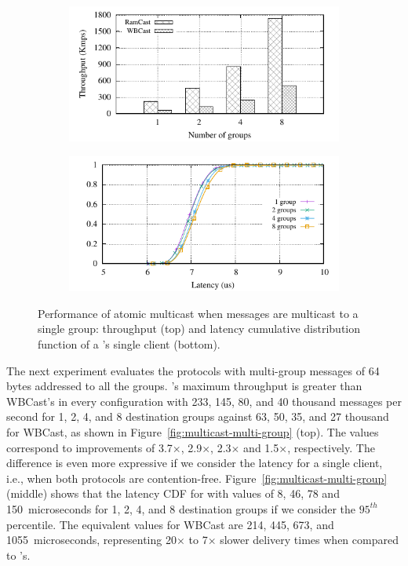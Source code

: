 \begin{figure}[htp!]
  \begin{subfigure}{\columnwidth}
    \advance\leftskip-0.25cm
    \includegraphics[width=1.01\columnwidth]{figures/benchmark/graphs/figure-genuine-compare-throughput}
  \end{subfigure}
  \begin{subfigure}{\columnwidth}
    \centering
    \includegraphics[width=0.95\columnwidth]{figures/benchmark/graphs/figure-genuine-compare-latency-cdf}
  \end{subfigure}
  \caption{Performance of atomic multicast when messages are multicast to a single group: throughput (top) and latency cumulative distribution function of a \libname's single client (bottom).}
  \label{fig:multicast-single-group}
\end{figure}

The next experiment evaluates the protocols with multi-group messages of 64 bytes addressed to all the groups.
\libname's maximum throughput is greater than WBCast's in every configuration with 233, 145, 80, and 40 thousand messages per second for 1, 2, 4, and 8 destination groups against 63, 50, 35, and 27 thousand for WBCast, as shown in Figure~\ref{fig:multicast-multi-group} (top).
The values correspond to improvements of 3.7$\times$, 2.9$\times$, 2.3$\times$ and 1.5$\times$, respectively.
The difference is even more expressive if we consider the latency for a single client, i.e., when both protocols are contention-free. Figure~\ref{fig:multicast-multi-group} (middle) shows that the latency CDF for \libname with values of 8, 46, 78 and 150~microseconds for 1, 2, 4, and 8 destination groups if we consider the $95^{th}$ percentile. 
The equivalent values for WBCast are 214, 445, 673, and 1055~microseconds, representing 20$\times$ to 7$\times$ slower delivery times when compared to \libname's.

